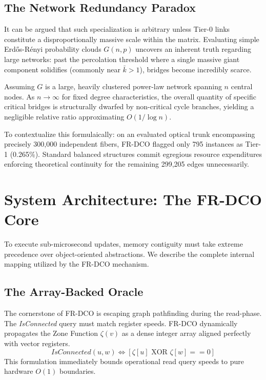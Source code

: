 \documentclass[runningheads]{llncs}
\begin{document}
\subsection{The Network Redundancy Paradox}
It can be argued that such specialization is arbitrary unless Tier-0 links constitute a disproportionally massive scale within the matrix. Evaluating simple Erdős-R\'{e}nyi probability clouds $G(n, p)$ uncovers an inherent truth regarding large networks: past the percolation threshold where a single massive giant component solidifies (commonly near $\bar{k} > 1$), bridges become incredibly scarce. 
\begin{lemma}
Assuming $G$ is a large, heavily clustered power-law network spanning $n$ central nodes. As $n \to \infty$ for fixed degree characteristics, the overall quantity of specific critical bridges is structurally dwarfed by non-critical cycle branches, yielding a negligible relative ratio approximating $O(1/\log n)$. 
\end{lemma}
To contextualize this formulaically: on an evaluated optical trunk encompassing precisely 300,000 independent fibers, FR-DCO flagged only 795 instances as Tier-1 (0.265\%). Standard balanced structures commit egregious resource expenditures enforcing theoretical continuity for the remaining 299,205 edges unnecessarily.

\section{System Architecture: The FR-DCO Core}

To execute sub-microsecond updates, memory contiguity must take extreme precedence over object-oriented abstractions. We describe the complete internal mapping utilized by the FR-DCO mechanism.

\subsection{The Array-Backed Oracle}
The cornerstone of FR-DCO is escaping graph pathfinding during the read-phase. The \textit{IsConnected} query must match register speeds.
FR-DCO dynamically propagates the Zone Function $\zeta(v)$ as a dense integer array aligned perfectly with vector registers. 
\begin{equation}
IsConnected(u, w) \iff [\zeta[u] \text{ XOR } \zeta[w] == 0]
\end{equation}
This formulation immediately bounds operational read query speeds to pure hardware $O(1)$ boundaries.
\end{document}
